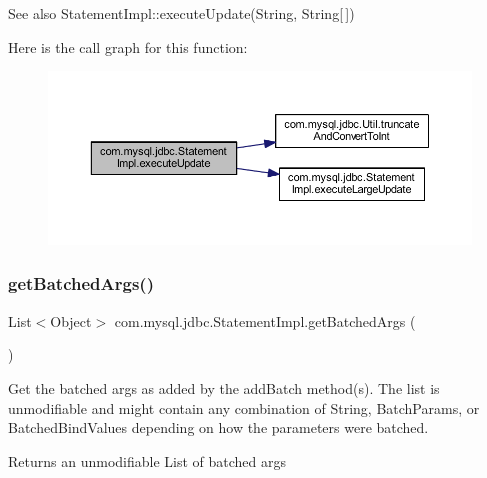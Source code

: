 \begin{DoxySeeAlso}{See also}
Statement\+Impl\+::execute\+Update(\+String, String\mbox{[}$\,$\mbox{]}) 
\end{DoxySeeAlso}
Here is the call graph for this function\+:
\nopagebreak
\begin{figure}[H]
\begin{center}
\leavevmode
\includegraphics[width=350pt]{classcom_1_1mysql_1_1jdbc_1_1_statement_impl_af3e2e09209cea46435afa83318cceced_cgraph}
\end{center}
\end{figure}
\mbox{\label{classcom_1_1mysql_1_1jdbc_1_1_statement_impl_a499ced5209fbe33c253203ee964216b0}} 
\subsubsection{\texorpdfstring{get\+Batched\+Args()}{getBatchedArgs()}}
{\footnotesize\ttfamily List$<$Object$>$ com.\+mysql.\+jdbc.\+Statement\+Impl.\+get\+Batched\+Args (\begin{DoxyParamCaption}{ }\end{DoxyParamCaption})}

Get the batched args as added by the add\+Batch method(s). The list is unmodifiable and might contain any combination of String, Batch\+Params, or Batched\+Bind\+Values depending on how the parameters were batched.

\begin{DoxyReturn}{Returns}
an unmodifiable List of batched args 
\end{DoxyReturn}
\mbox{\label{classcom_1_1mysql_1_1jdbc_1_1_statement_impl_a687b9b26a0936a0d3c1e7466e2e2ffc2}} 
